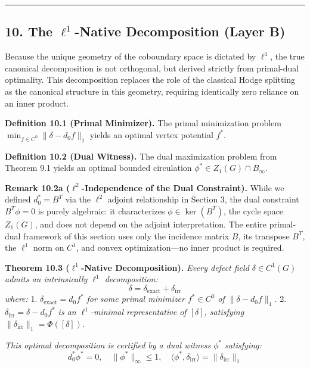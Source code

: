 \documentclass[
]{article}
\begin{document}
\begin{center}\rule{0.5\linewidth}{0.5pt}\end{center}

\subsection{\texorpdfstring{10. The \(\ell^1\)-Native Decomposition
\textbf{(Layer
B)}}{10. The \textbackslash ell\^{}1-Native Decomposition (Layer B)}}\label{the-ell1-native-decomposition-layer-b}

Because the unique geometry of the coboundary space is dictated by
\(\ell^1\), the true canonical decomposition is not orthogonal, but
derived strictly from primal-dual optimality. This decomposition
replaces the role of the classical Hodge splitting as the canonical
structure in this geometry, requiring identically zero reliance on an
inner product.

\textbf{Definition 10.1 (Primal Minimizer).} The primal minimization
problem \(\min_{f \in C^0} \|\delta - d_0 f\|_1\) yields an optimal
vertex potential \(f^*\).

\textbf{Definition 10.2 (Dual Witness).} The dual maximization problem
from Theorem 9.1 yields an optimal bounded circulation
\(\phi^* \in Z_1(G) \cap B_\infty\).

\textbf{Remark 10.2a (\(\ell^2\)-Independence of the Dual Constraint).}
While we defined \(d_0^* = B^T\) via the \(\ell^2\) adjoint relationship
in Section 3, the dual constraint \(B^T \phi = 0\) is purely algebraic:
it characterizes \(\phi \in \ker(B^T)\), the cycle space \(Z_1(G)\), and
does not depend on the adjoint interpretation. The entire primal-dual
framework of this section uses only the incidence matrix \(B\), its
transpose \(B^T\), the \(\ell^1\) norm on \(C^1\), and convex
optimization---no inner product is required.

\textbf{Theorem 10.3 (\(\ell^1\)-Native Decomposition).} \emph{Every
defect field \(\delta \in C^1(G)\) admits an intrinsically \(\ell^1\)
decomposition:}
\[ \delta = \delta_{\text{exact}} + \delta_{\text{irr}} \] \emph{where:}
1. \(\delta_{\text{exact}} = d_0 f^*\) \emph{for some primal minimizer
\(f^* \in C^0\) of \(\|\delta - d_0 f\|_1\).} 2.
\(\delta_{\text{irr}} = \delta - d_0 f^*\) \emph{is an
\(\ell^1\)-minimal representative of \([\delta]\), satisfying}
\(\|\delta_{\text{irr}}\|_1 = \Phi([\delta])\).

\emph{This optimal decomposition is certified by a dual witness
\(\phi^*\) satisfying:}
\[ d_0^* \phi^* = 0, \quad \|\phi^*\|_\infty \leq 1, \quad \langle \phi^*, \delta_{\text{irr}} \rangle = \|\delta_{\text{irr}}\|_1 \]
\end{document}
